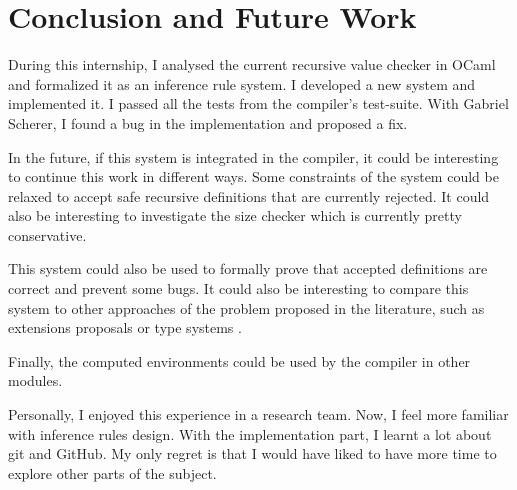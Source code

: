\documentclass{article}
\begin{document}
\section*{Conclusion and Future Work}
During this internship, I analysed the current recursive value checker in OCaml
and formalized it as an inference rule system. I developed a new system and
implemented it. I passed all the tests from the compiler's test-suite. With
Gabriel Scherer, I found a bug in the implementation and proposed a fix.

In the future, if this system is integrated in the compiler, it could be
interesting to continue this work in different ways. Some constraints of the
system could be relaxed to accept safe recursive definitions that are currently
rejected. It could also be interesting to investigate the size checker which is
currently pretty conservative.

This system could also be used to formally prove that accepted definitions are
correct and prevent some bugs. It could also be interesting to compare this
system to other approaches of the problem proposed in the literature, such as
extensions proposals \cite{jeannin2012cocaml} or type systems
\cite{dreyer2004type}.

Finally, the computed environments could be used by the compiler in other
modules.

Personally, I enjoyed this experience in a research team. Now, I feel more
familiar with inference rules design. With the implementation part, I learnt a
lot about git and GitHub. My only regret is that I would have liked to have
more time to explore other parts of the subject.



\end{document}
